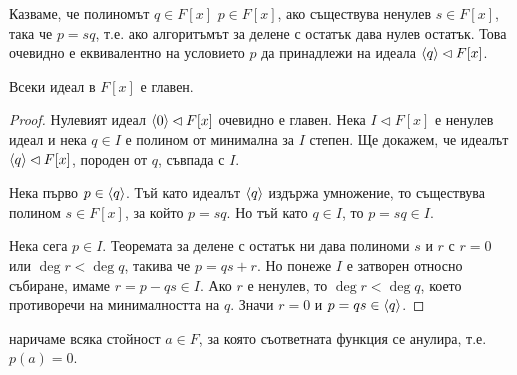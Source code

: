 \documentclass[numbers=endperiod, bibliography=totocnumbered]{scrartcl}
\begin{document}
\begin{definition}
  Казваме, че полиномът \( q \in F[x] \)  \( p \in F[x] \), ако съществува ненулев \( s \in F[x] \), така че \( p = sq \), т.е. ако алгоритъмът за делене с остатък дава нулев остатък. Това очевидно е еквивалентно на условието \( p \) да принадлежи на идеала \( \left\langle q \right\rangle \lhd F[x] \).
\end{definition}

\begin{theorem}\label{thm:pid}
  Всеки идеал в \( F[x] \) е главен.
\end{theorem}
\begin{proof}
  Нулевият идеал \( \left\langle 0 \right\rangle \lhd F[x] \) очевидно е главен. Нека \( I \lhd F[x] \) е ненулев идеал и нека \( q \in I \) е полином от минимална за \( I \) степен. Ще докажем, че идеалът \( \left\langle q \right\rangle \lhd F[x] \), породен от \( q \), съвпада с \( I \).

  Нека първо \( p \in \left\langle q \right\rangle \). Тъй като идеалът \( \left\langle q \right\rangle \) издържа умножение, то съществува полином \( s \in F[x] \), за който \( p = sq \). Но тъй като \( q \in I \), то \( p = sq \in I \).

  Нека сега \( p \in I \). Теоремата за делене с остатък ни дава полиноми \( s \) и \( r \) с \( r = 0 \) или \( \deg r < \deg q \), такива че \( p = qs + r \). Но понеже \( I \) е затворен относно събиране, имаме \( r = p - qs \in I \). Ако \( r \) е ненулев, то \( \deg r < \deg q \), което противоречи на минималността на \( q \). Значи \( r = 0 \) и \( p = qs \in \left\langle q \right\rangle \).
\end{proof}

\begin{definition}
   наричаме всяка стойност \( a \in F \), за която съответната функция се анулира, т.е. \( p(a) = 0 \).
\end{definition}
\end{document}
